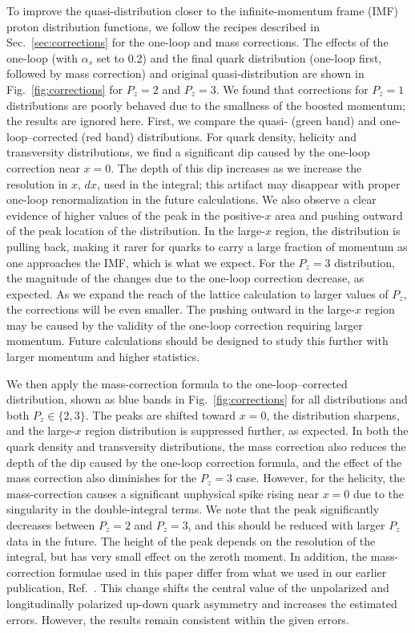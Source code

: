 To improve the quasi-distribution closer to the infinite-momentum frame (IMF) proton distribution functions, we follow the recipes described in
Sec.~\ref{sec:corrections} for the one-loop and mass corrections. 
The effects of the one-loop (with $\alpha_s$ set to 0.2) and the final quark distribution (one-loop first, 
followed by mass correction) and original quasi-distribution are shown in Fig.~\ref{fig:corrections} for $P_z=2$ and $P_z=3$. We found that corrections for $P_z=1$ distributions are poorly behaved due to the smallness of the boosted momentum; the results are ignored here. 
First, we compare the quasi- (green band) and one-loop--corrected (red band) distributions. 
For quark density, helicity and transversity distributions, 
we find a significant dip caused by the one-loop correction near $x=0$.
The depth of this dip 
increases as we increase the resolution in $x$, $dx$, used in the integral; 
this artifact may disappear with proper one-loop renormalization in the future calculations.
We also observe a clear evidence of higher values of the peak in the positive-$x$ area and pushing outward of the peak location of the distribution. In the large-$x$ region, the distribution is pulling back, making it rarer for quarks to carry a large
fraction of momentum as one approaches the IMF, which is what we expect. 
For the $P_z=3$ distribution, the magnitude of the changes due to the one-loop correction decrease, as expected.
As we expand the reach of the lattice calculation to larger values of $P_z$, the corrections will be even smaller. 
The pushing outward in the large-$x$ region
may be caused
by the validity of the one-loop correction requiring larger momentum. Future calculations should be
designed to study this further with larger momentum and higher statistics. 

We then apply the mass-correction formula to the one-loop--corrected distribution, shown as blue bands in 
Fig.~\ref{fig:corrections} for all distributions and both $P_z\in\{2,3\}$. 
The peaks are shifted toward $x=0$, the distribution sharpens, and the large-$x$ region distribution is suppressed further, as expected. 
In both the quark density and transversity distributions,
the mass correction also reduces the depth of the dip caused by the one-loop correction formula, 
and the effect of the mass correction also diminishes for the $P_z=3$ case. 
However, for the helicity, the mass-correction
causes a significant unphysical spike rising near $x=0$ due to the singularity in the double-integral terms. 
We note that the peak significantly decreases between $P_z=2$ and $P_z=3$,
and this should be reduced with larger $P_z$ data in the future. 
The height of the peak depends on the resolution of the integral, but has very small effect on the zeroth moment.  
In addition, the mass-correction formulae used in this paper differ from
what we used in our earlier publication, Ref.~\cite{Lin:2014zya}.
This change shifts the central value of the unpolarized and longitudinally polarized up-down quark
asymmetry and increases the estimated errors. However, the results remain consistent within the given errors.

